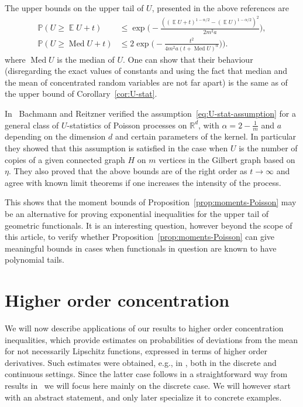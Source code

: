 \documentclass[a4paper]{amsart}
\theoremstyle{definition}
\theoremstyle{remark}
\numberwithin{equation}{section}
\newcommand*{\RR}{\mathbb{R}}
\DeclareMathOperator{\EE}{\mathbb{E}} %
\newcommand*{\PP}{\mathbb{P}} %
\DeclareMathOperator{\Med}{Med}
\begin{document}
  The upper bounds on the upper tail of $U$, presented in the above references are
  \begin{align*}
    \PP(U \ge \EE U + t) &\le \exp\Big(-\frac{((\EE U + t)^{1-\alpha/2} - (\EE U)^{1-\alpha/2})^2}{2m^2 a}\Big),\\
    \PP(U \ge \Med U + t) &\le  2\exp\Big(-\frac{t^2}{4m^2a (t+ \Med U)^\alpha}\Big)\Big).
  \end{align*}
  where $\Med U$ is the median of $U$. One can show that their behaviour (disregarding the exact values of constants and using the fact that median and the mean of concentrated random variables are not far apart) is the same as of the upper bound of Corollary~\ref{cor:U-stat}.

  In~\cite{MR3473096} Bachmann and Reitzner verified the assumption~\eqref{eq:U-stat-assumption} for a general class of $U$-statistics of Poisson processes on $\RR^d$, with $\alpha = 2 - \frac{1}{m}$ and $a$ depending on the dimension $d$ and  certain parameters of the kernel. In particular they showed that this assumption is satisfied in the case when $U$ is the number of copies of a given connected graph $H$ on $m$ vertices in the Gilbert graph based on $\eta$. They also proved that the above bounds are of the right order as $t\to \infty$ and agree with known limit theorems if one increases the intensity of the process.

  This shows that the moment bounds of Proposition~\ref{prop:moments-Poisson} may be an alternative for proving exponential inequalities for the upper tail of geometric functionals. It is an interesting question, however beyond the scope of this article, to verify whether Proposition~\ref{prop:moments-Poisson} can give meaningful bounds in cases when functionals in question are known to have polynomial tails.

\section{Higher order concentration}\label{sec:higher-order}

We will now describe applications of our results to higher order concentration inequalities, which provide estimates on probabilities of deviations from the mean for not necessarily Lipschitz functions, expressed in terms of higher order derivatives. Such estimates were obtained, e.g., in \cite{MR3383337,MR3743923,MR3670792,gtze2018higher,MR3949267}, both in the discrete and continuous settings. Since the latter case follows in a straightforward way from results in~\cite{MR3383337} we will focus here mainly on the discrete case. We will however start with an abstract statement, and only later specialize it to concrete examples.
\end{document}
